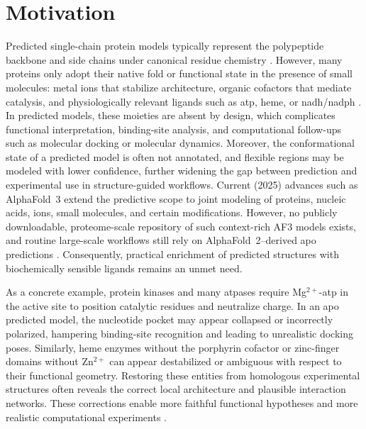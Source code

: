 \section{Motivation}
Predicted single-chain protein models typically represent the polypeptide backbone and side chains under canonical residue chemistry \cite{AlphaFoldServer}. However, many proteins only adopt their native fold or functional state in the presence of small molecules: metal ions that stabilize architecture, organic cofactors that mediate catalysis, and physiologically relevant ligands such as \gls{atp}, heme, or \gls{nadh}/\gls{nadph} \cite{tangCharacterizationCofactorInducedFolding2009,xiaoNADHNADPHRedox2018}. In predicted models, these moieties are absent by design, which complicates functional interpretation, binding-site analysis, and computational follow-ups such as molecular docking or molecular dynamics. Moreover, the conformational state of a predicted model is often not annotated, and flexible regions may be modeled with lower confidence, further widening the gap between prediction and experimental use in structure-guided workflows.
Current (2025) advances such as AlphaFold~3 extend the predictive scope to joint modeling of proteins, nucleic acids, ions, small molecules, and certain modifications. However, no publicly downloadable, proteome-scale repository of such context-rich AF3 models exists, and routine large-scale workflows still rely on AlphaFold~2--derived apo predictions \cite{abramsonAccurateStructurePrediction2024}. Consequently, practical enrichment of predicted structures with biochemically sensible ligands remains an unmet need.

As a concrete example, protein kinases and many \gls{atp}ases require Mg$^{2+}$-\gls{atp} in the active site to position catalytic residues and neutralize charge. In an apo predicted model, the nucleotide pocket may appear collapsed or incorrectly polarized, hampering binding-site recognition and leading to unrealistic docking poses. Similarly, heme enzymes without the porphyrin cofactor or zinc-finger domains without Zn$^{2+}$ can appear destabilized or ambiguous with respect to their functional geometry. Restoring these entities from homologous experimental structures often reveals the correct local architecture and plausible interaction networks. These corrections enable more faithful functional hypotheses and more realistic computational experiments \cite{hekkelmanAlphaFillEnrichingAlphaFold2023}.

